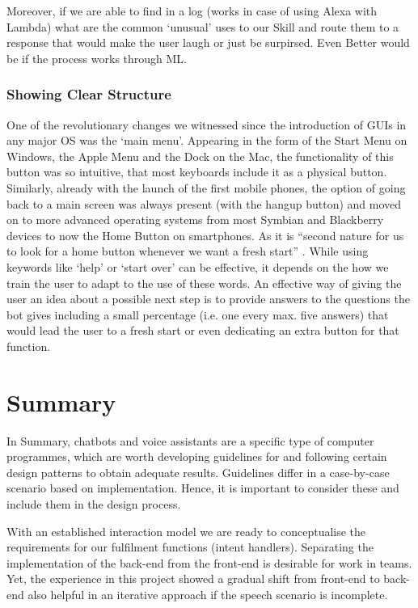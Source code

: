 Moreover, if we are able to find in a log (works in case of using Alexa with Lambda) what are the common `unusual' uses to our Skill and route them to a response that would make the user laugh or just be surpirsed. Even Better would be if the process works through ML.


\subsubsection*{Showing Clear Structure}
One of the revolutionary changes we witnessed since the introduction of GUIs in any major OS was the `main menu'. Appearing in the form of the Start Menu on Windows, the Apple Menu and the Dock on the Mac, the functionality of this button was so intuitive, that most keyboards include it as a physical button. Similarly, already with the launch of the first mobile phones, the option of going back to a main screen was always present (with the hangup button) and moved on to more advanced operating systems from most Symbian and Blackberry devices to now the Home Button on smartphones. As it is ``second nature for us to look for a home button whenever we want a fresh start'' \cite{uxbot}. While using keywords like `help' or `start over' can be effective, it depends on the how we train the user to adapt to the use of these words.
An effective way of giving the user an idea about a possible next step is to provide answers to the questions the bot gives including a small percentage (i.e. one every max. five answers) that would lead the user to a fresh start or even dedicating an extra button for that function.
\\

\section{Summary}
In Summary, chatbots and voice assistants are a specific type of computer programmes, which are worth developing guidelines for and following certain design patterns to obtain adequate results. Guidelines differ in a case-by-case scenario based on implementation. Hence, it is important to consider these and include them in the design process.

With an established interaction model we are ready to conceptualise the requirements for our fulfilment functions (intent handlers). 
Separating the implementation of the back-end from the front-end is desirable for work in teams. Yet, the experience in this project showed a gradual shift from front-end to back-end also helpful in an iterative approach if the speech scenario is incomplete.
